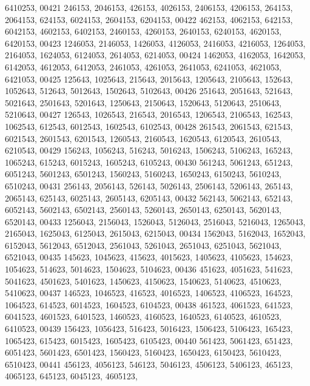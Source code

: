 \begin{DoxyCode}
      6410253,
00421        246153, 2046153,  426153, 4026153, 2406153, 4206153,  264153, 2064153,  624153, 6024153, 2604153, 
      6204153,
00422        462153, 4062153,  642153, 6042153, 4602153, 6402153, 2460153, 4260153, 2640153, 6240153, 4620153, 
      6420153,
00423       1246053, 2146053, 1426053, 4126053, 2416053, 4216053, 1264053, 2164053, 1624053, 6124053, 2614053, 
      6214053,
00424       1462053, 4162053, 1642053, 6142053, 4612053, 6412053, 2461053, 4261053, 2641053, 6241053, 4621053, 
      6421053,
00425        125643, 1025643,  215643, 2015643, 1205643, 2105643,  152643, 1052643,  512643, 5012643, 1502643, 
      5102643,
00426        251643, 2051643,  521643, 5021643, 2501643, 5201643, 1250643, 2150643, 1520643, 5120643, 2510643, 
      5210643,
00427        126543, 1026543,  216543, 2016543, 1206543, 2106543,  162543, 1062543,  612543, 6012543, 1602543, 
      6102543,
00428        261543, 2061543,  621543, 6021543, 2601543, 6201543, 1260543, 2160543, 1620543, 6120543, 2610543, 
      6210543,
00429        156243, 1056243,  516243, 5016243, 1506243, 5106243,  165243, 1065243,  615243, 6015243, 1605243, 
      6105243,
00430        561243, 5061243,  651243, 6051243, 5601243, 6501243, 1560243, 5160243, 1650243, 6150243, 5610243, 
      6510243,
00431        256143, 2056143,  526143, 5026143, 2506143, 5206143,  265143, 2065143,  625143, 6025143, 2605143, 
      6205143,
00432        562143, 5062143,  652143, 6052143, 5602143, 6502143, 2560143, 5260143, 2650143, 6250143, 5620143, 
      6520143,
00433       1256043, 2156043, 1526043, 5126043, 2516043, 5216043, 1265043, 2165043, 1625043, 6125043, 2615043, 
      6215043,
00434       1562043, 5162043, 1652043, 6152043, 5612043, 6512043, 2561043, 5261043, 2651043, 6251043, 5621043, 
      6521043,
00435        145623, 1045623,  415623, 4015623, 1405623, 4105623,  154623, 1054623,  514623, 5014623, 1504623, 
      5104623,
00436        451623, 4051623,  541623, 5041623, 4501623, 5401623, 1450623, 4150623, 1540623, 5140623, 4510623, 
      5410623,
00437        146523, 1046523,  416523, 4016523, 1406523, 4106523,  164523, 1064523,  614523, 6014523, 1604523, 
      6104523,
00438        461523, 4061523,  641523, 6041523, 4601523, 6401523, 1460523, 4160523, 1640523, 6140523, 4610523, 
      6410523,
00439        156423, 1056423,  516423, 5016423, 1506423, 5106423,  165423, 1065423,  615423, 6015423, 1605423, 
      6105423,
00440        561423, 5061423,  651423, 6051423, 5601423, 6501423, 1560423, 5160423, 1650423, 6150423, 5610423, 
      6510423,
00441        456123, 4056123,  546123, 5046123, 4506123, 5406123,  465123, 4065123,  645123, 6045123, 4605123, 

\end{DoxyCode}
